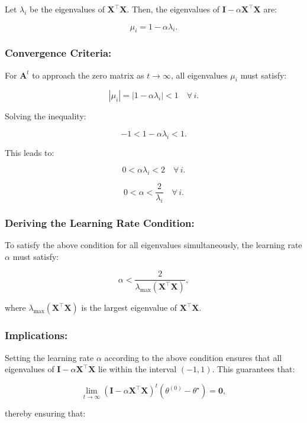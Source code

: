 Let \(\lambda_i\) be the eigenvalues of \(\boldsymbol{X}^\top \boldsymbol{X}\). Then, the eigenvalues of \(\mathbf{I} - \alpha \boldsymbol{X}^\top \boldsymbol{X}\) are:

\[
    \mu_i = 1 - \alpha \lambda_i.
\]

\subsubsection{Convergence Criteria:}

For \(\mathbf{A}^t\) to approach the zero matrix as \(t \to \infty\), all eigenvalues \(\mu_i\) must satisfy:

\[
    |\mu_i| = |1 - \alpha \lambda_i| < 1 \quad \forall \, i.
\]

Solving the inequality:

\[
    -1 < 1 - \alpha \lambda_i < 1.
\]

This leads to:

\[
    0 < \alpha \lambda_i < 2 \quad \forall \, i.
\]

\[
    0 < \alpha < \frac{2}{\lambda_i} \quad \forall \, i.
\]

\subsubsection{Deriving the Learning Rate Condition:}

To satisfy the above condition for all eigenvalues simultaneously, the learning rate \(\alpha\) must satisfy:

\[
    \alpha < \frac{2}{\lambda_{\max}(\boldsymbol{X}^\top \boldsymbol{X})},
\]

where \(\lambda_{\max}(\boldsymbol{X}^\top \boldsymbol{X})\) is the largest eigenvalue of \(\boldsymbol{X}^\top \boldsymbol{X}\).

\subsubsection{Implications:}

Setting the learning rate \(\alpha\) according to the above condition ensures that all eigenvalues of \(\mathbf{I} - \alpha \boldsymbol{X}^\top \boldsymbol{X}\) lie within the interval \((-1, 1)\). This guarantees that:

\[
    \lim_{t \to \infty} (\mathbf{I} - \alpha \boldsymbol{X}^\top \boldsymbol{X})^t (\theta^{(0)} - \theta^\star) = \mathbf{0},
\]

thereby ensuring that:

